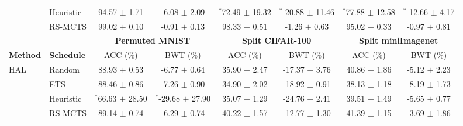 \begin{tabular}{llcccccc}
	& Heuristic           & 94.57 $\pm$ 1.71     & -6.08 $\pm$ 2.09      & $^{*}$72.49 $\pm$ 19.32        & $^{*}$-20.88 $\pm$ 11.46       & $^{*}$77.88 $\pm$ 12.58      & $^{*}$-12.66 $\pm$ 4.17      \\
	& RS-MCTS              & 99.02 $\pm$ 0.10     & -0.91 $\pm$ 0.13      & 98.33 $\pm$ 0.51         & -1.26 $\pm$ 0.63         & 95.02 $\pm$ 0.33       & -0.97 $\pm$ 0.81       \\ \midrule
	\textbf{}              & \textbf{}         & \multicolumn{2}{c}{\textbf{Permuted MNIST}}  & \multicolumn{2}{c}{\textbf{Split CIFAR-100}} & \multicolumn{2}{c}{\textbf{Split miniImagenet}} \\ \midrule
	\textbf{Method}        & \textbf{Schedule} & ACC (\%)             & BWT (\%)              & ACC (\%)             & BWT (\%)              & ACC (\%)               & BWT (\%)               \\ \midrule
	\multirow{4}{*}{HAL}   & Random            & 88.93 $\pm$ 0.53  & -6.77 $\pm$ 0.64   & 35.90 $\pm$ 2.47  & -17.37 $\pm$ 3.76  & 40.86 $\pm$ 1.86    & -5.12 $\pm$ 2.23    \\
	& ETS               & 88.46 $\pm$ 0.86  & -7.26 $\pm$ 0.90   & 34.90 $\pm$ 2.02  & -18.92 $\pm$ 0.91  & 38.13 $\pm$ 1.18    & -8.19 $\pm$ 1.73    \\
	& Heuristic           & $^{*}$66.63 $\pm$ 28.50 & $^{*}$-29.68 $\pm$ 27.90 & 35.07 $\pm$ 1.29  & -24.76 $\pm$ 2.41  & 39.51 $\pm$ 1.49    & -5.65 $\pm$ 0.77    \\
	& RS-MCTS              & 89.14 $\pm$ 0.74  & -6.29 $\pm$ 0.74   & 40.22 $\pm$ 1.57  & -12.77 $\pm$ 1.30  & 41.39 $\pm$ 1.15    & -3.69 $\pm$ 1.86    \\ \midrule

\end{tabular}
